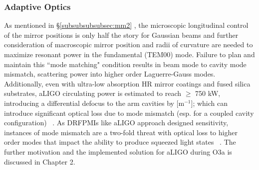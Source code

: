 


\subsubsection{Adaptive Optics}
As mentioned in \hyperref[subsubsubsubsec:mm2]{\S \ref*{subsubsubsubsec:mm2}} , the microscopic longitudinal control of the mirror positions is only half the story for Gaussian beams and further consideration of macroscopic mirror position and radii of curvature are needed to maximize resonant power in the fundamental (TEM00) mode. Failure to plan and maintain this ``mode matching" condition results in beam mode to cavity mode mismatch, scattering power into higher order Laguerre-Gauss modes. Additionally, even with ultra-low absorption HR mirror coatings and fused silica substrates, aLIGO circulating power is estimated to reach $\geq$ 750 kW, introducing a differential defocus to the arm cavities by [$\mathrm{m}^{-1}$]; which can introduce significant optical loss due to mode mismatch (esp. for a coupled cavity configuration) ~\cite{tvo}. As DRFPMIs like aLIGO approach designed sensitivity, instances of mode mismatch are a two-fold threat with optical loss to higher order modes that impact the ability to produce squeezed light states ~\cite{oelker:2014}. The further motivation and the implemented solution for aLIGO during O3a is discussed in Chapter 2. 


